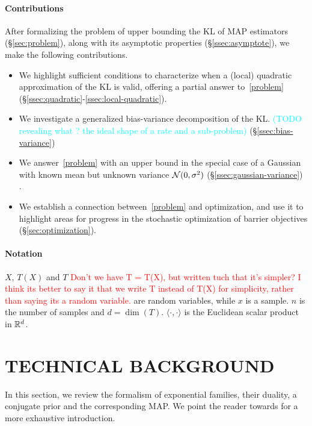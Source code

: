 \documentclass[twoside]{article}
\let\oldsection\section
\renewcommand{\section}[1]{\oldsection{\texorpdfstring{\uppercase{#1}}{#1}}}
\newcommand{\TODO}[1]{\textcolor{cyan}{(TODO #1)}}
\begin{document}
\paragraph{Contributions}
After formalizing the problem of upper bounding the KL of MAP estimators (\S\ref{sec:problem}), along with its asymptotic properties (\S\ref{ssec:asymptote}), we make the following contributions.
\begin{itemize}
	\itemsep0em
	\item We highlight sufficient conditions to characterize when a (local) quadratic approximation of the KL is valid, offering a partial answer to~\eqref{problem} (\S\ref{ssec:quadratic}-\ref{ssec:local-quadratic}).
	\item We investigate a generalized bias-variance decomposition of the KL\citep{pfau2013generalized}. \TODO{revealing what ? the ideal shape of a rate and a sub-problem} (\S\ref{ssec:bias-variance})
	\item We answer~\eqref{problem} with an upper bound in the special case of a Gaussian with known mean but unknown variance ${\mathcal N}(0,\sigma^2)$ (\S\ref{ssec:gaussian-variance}) .
	\item We establish a connection between~\eqref{problem} and optimization, and use it to highlight areas for progress in the stochastic optimization of barrier objectives (\S\ref{sec:optimization}).
\end{itemize}


\paragraph{Notation}
$X,\,T(X)$ and $T$ \textcolor{red}{Don't we have T = T(X), but written tuch that it's simpler? I think its better to say it that we write T instead of T(X) for simplicity, rather than saying its a random variable.} are random variables, while $x$ is a sample.
$n$ is the number of samples and $d= \dim(T)$.
$\langle \cdot , \cdot \rangle$ is the Euclidean scalar product in $\mathbb{R}^d$.


\section{Technical background}
\label{sec:background}
In this section, we review the formalism of exponential families, their duality, a conjugate prior and the corresponding MAP.
We point the reader towards \citet[Chapter 3]{wainwright2008graphical} for a more exhaustive introduction.
\end{document}
